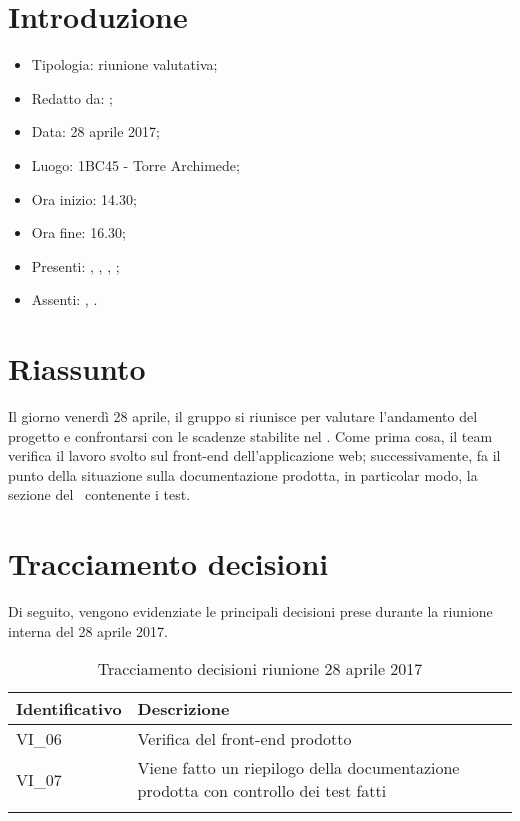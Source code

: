 \section{Introduzione}

	\begin{itemize}
		\item Tipologia: riunione valutativa;
		\item Redatto da: \DS;
		\item Data: 28 aprile 2017;
		\item Luogo: 1BC45 - Torre Archimede;
		\item Ora inizio: 14.30;
		\item Ora fine: 16.30;
		\item Presenti: \AN, \DS, \AS, \NS;	
		\item Assenti: \MC, \DAN.
	\end{itemize}

\section{Riassunto}
Il giorno venerdì 28 aprile, il gruppo si riunisce per valutare l'andamento del progetto e confrontarsi con le scadenze stabilite nel \PdP.
Come prima cosa, il team verifica il lavoro svolto sul front-end dell'applicazione web; successivamente, fa il punto della situazione sulla documentazione prodotta, in particolar modo, la sezione del \PdQ\ contenente i test.

\section{Tracciamento decisioni}
Di seguito, vengono evidenziate le principali decisioni prese durante la riunione interna del 28 aprile 2017.

\begin{longtable}{|>{\centering\arraybackslash}p{4cm}|>{\centering\arraybackslash}p{9cm}|}
	\hline \rowcolor{Gray}
	\textbf{Identificativo} & \textbf{Descrizione}\\
	\hline
	\endhead
			VI\_06	&  Verifica del front-end prodotto \\
			\hline
			VI\_07 &  Viene fatto un riepilogo della documentazione prodotta con controllo dei test fatti \\
			\hline
		\caption{Tracciamento decisioni riunione 28 aprile 2017}
\end{longtable}